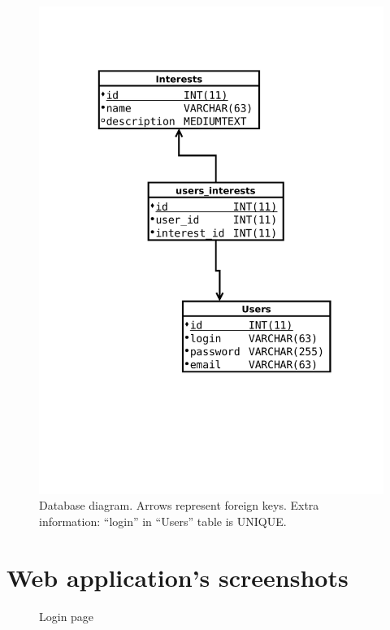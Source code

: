 \documentclass[a4paper,11pt,openany]{report}
\begin{document}
\begin{figure}[h!t]
  \includegraphics[trim=0 200 0 110,clip,width=\textwidth]{database.pdf}
  \caption{Database diagram. Arrows represent foreign keys. Extra information: ``login'' in ``Users'' table is UNIQUE.}
  \label{figure:database}
\end{figure}
  
  
\chapter{Web application's screenshots} \label{app:screenshots}

\begin{figure}[ht!]
  \begin{center}
    \caption{Login page}
    \label{figure:login}
  \end{center}
\end{figure}
\end{document}
